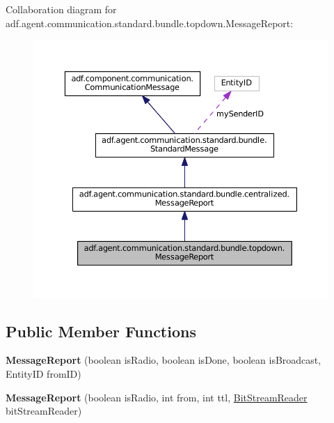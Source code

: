 Collaboration diagram for adf.\+agent.\+communication.\+standard.\+bundle.\+topdown.\+Message\+Report\+:
\nopagebreak
\begin{figure}[H]
\begin{center}
\leavevmode
\includegraphics[width=350pt]{classadf_1_1agent_1_1communication_1_1standard_1_1bundle_1_1topdown_1_1MessageReport__coll__graph}
\end{center}
\end{figure}
\subsection*{Public Member Functions}
\begin{DoxyCompactItemize}
\item 
\hypertarget{classadf_1_1agent_1_1communication_1_1standard_1_1bundle_1_1topdown_1_1MessageReport_a9ade58ec0aa0cb99bd8c241964296896}{}\label{classadf_1_1agent_1_1communication_1_1standard_1_1bundle_1_1topdown_1_1MessageReport_a9ade58ec0aa0cb99bd8c241964296896} 
{\bfseries Message\+Report} (boolean is\+Radio, boolean is\+Done, boolean is\+Broadcast, Entity\+ID from\+ID)
\item 
\hypertarget{classadf_1_1agent_1_1communication_1_1standard_1_1bundle_1_1topdown_1_1MessageReport_aa6ad7e2e011615f7d97d928eb3335a90}{}\label{classadf_1_1agent_1_1communication_1_1standard_1_1bundle_1_1topdown_1_1MessageReport_aa6ad7e2e011615f7d97d928eb3335a90} 
{\bfseries Message\+Report} (boolean is\+Radio, int from, int ttl, \hyperlink{classadf_1_1component_1_1communication_1_1util_1_1BitStreamReader}{Bit\+Stream\+Reader} bit\+Stream\+Reader)
\end{DoxyCompactItemize}
